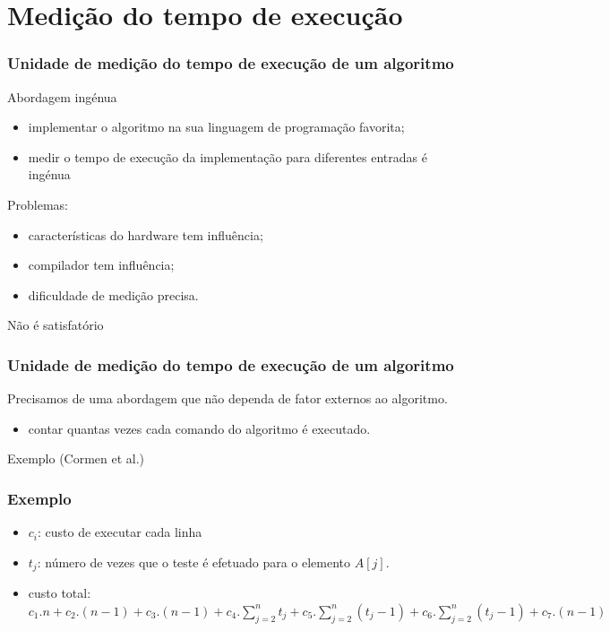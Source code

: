 \documentclass[handout]{beamer}
\begin{document}
\section{Medição do tempo de execução}

\begin{frame}
  \frametitle{Unidade de medição do tempo de execução de um algoritmo}
    
  \begin{block}{Abordagem ingénua}
    \begin{itemize}
      \item implementar o algoritmo na sua linguagem de programação favorita;
      \item medir o tempo de execução da implementação para diferentes entradas é ingénua
      \end{itemize}
      Problemas:
      \begin{itemize}
      \item características do hardware tem influência;
      \item compilador tem influência;
      \item dificuldade de medição precisa.
      \end{itemize}
      \alert{Não é satisfatório}
    \end{block}
    
\end{frame}
\begin{frame}
  \frametitle{Unidade de medição do tempo de execução de um algoritmo}
    
  Precisamos de uma abordagem que não dependa de fator externos ao algoritmo.

  \begin{itemize}
  \item contar quantas vezes cada comando do algoritmo é executado.
  \end{itemize}

  Exemplo (Cormen et al.)
\end{frame}

\begin{frame}
  \frametitle{Exemplo}

  

  \begin{itemize}
  \item $c_i$: custo de executar cada linha
  \item $t_j$: número de vezes que o teste é efetuado para o elemento $A[j]$.
  \item custo total: $c_1.n+c_2.(n-1)+c_3.(n-1)+c_4.\sum_{j=2}^{n} t_j + c_5.\sum_{j=2}^{n} (t_j-1) + c_6.\sum_{j=2}^{n} (t_j-1)+c_7.(n-1)$
  \end{itemize}
\end{frame}
\end{document}

